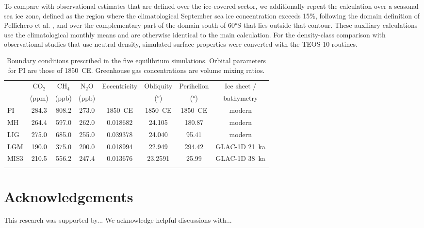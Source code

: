 \documentclass[pdflatex,sn-nature]{sn-jnl}
\begin{document}
To compare with observational estimates that are defined over the ice-covered sector, we additionally repeat the calculation over a seasonal sea ice zone, defined as the region where the climatological September sea ice concentration exceeds 15\%, following the domain definition of Pellichero et al. \cite{Pellichero2018}, and over the complementary part of the domain south of 60°S that lies outside that contour. These auxiliary calculations use the climatological monthly means and are otherwise identical to the main calculation. For the density-class comparison with observational studies that use neutral density, simulated surface properties were converted with the TEOS-10 routines.

\begin{table}[htbp]
\centering
\caption{Boundary conditions prescribed in the five equilibrium simulations. Orbital parameters for PI are those of 1850~CE. Greenhouse gas concentrations are volume mixing ratios.\label{tab:bc}}
\begin{tabular}{lccccccc}
\toprule
 & CO$_2$ & CH$_4$ & N$_2$O & Eccentricity & Obliquity & Perihelion & Ice sheet / \\
 & (ppm) & (ppb) & (ppb) & & (°) & (°) & bathymetry \\
\midrule
PI   & 284.3 & 808.2 & 273.0 & 1850~CE  & 1850~CE & 1850~CE & modern \\
MH   & 264.4 & 597.0 & 262.0 & 0.018682 & 24.105  & 180.87  & modern \\
LIG  & 275.0 & 685.0 & 255.0 & 0.039378 & 24.040  & 95.41   & modern \\
LGM  & 190.0 & 375.0 & 200.0 & 0.018994 & 22.949  & 294.42  & GLAC-1D 21~ka \\
MIS3 & 210.5 & 556.2 & 247.4 & 0.013676 & 23.2591 & 25.99   & GLAC-1D 38~ka \\
\botrule
\end{tabular}
\end{table}



\backmatter

\section*{Acknowledgements}
This research was supported by... We acknowledge helpful discussions with...
\end{document}
